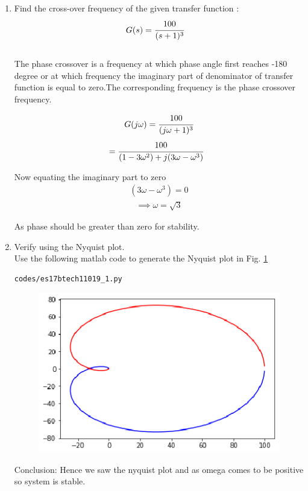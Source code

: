 \begin{enumerate}[label=\thesection.\arabic*.,ref=\thesection.\theenumi]

\item  Find the cross-over frequency of the  given transfer function :
\begin{align}
\label{eq:es17btech11019_system}
G(s) &= \cfrac{100}{(s+1)^3}
\end{align}
\\
\solution The phase crossover is a frequency at which phase angle first reaches -180 degree or at which frequency the imaginary part of denominator of transfer function is equal to zero.The corresponding frequency is the phase crossover frequency.


\begin{align}
G(j\omega)=\cfrac{100}{(j\omega+1)^3}
\end{align}
\begin{align}
 &= \cfrac{100}{(1-3\omega^2)+j(3\omega-\omega^3)}
\end{align}
     
Now equating the imaginary part to zero
\begin{align}
(3\omega-\omega^3)=0
\end{align}  
\begin{align}
\implies \omega = \sqrt{3}
\end{align}

As phase should be greater than zero for stability.

\item Verify using the Nyquist plot.
\\
\solution Use the following matlab code to generate the Nyquist plot in Fig.  \ref{fig:es17btech11019}
\begin{lstlisting}
codes/es17btech11019_1.py
\end{lstlisting}
%
\begin{figure}[!h]
  \includegraphics[width=\columnwidth]{./figs/es17btech11019.eps}
  \caption{}
  \label{fig:es17btech11019}
\end{figure}


Conclusion: Hence we saw the nyquist plot and as omega comes to be positive so system is stable.


\end{enumerate}